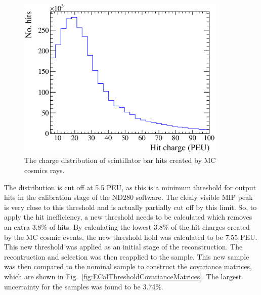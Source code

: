 \begin{figure}
  \centering
  \includegraphics[width=10cm]{images/measurement/systematics/detector/threshold/hit_charge_cosmic_MC_PEU.eps}
  \caption{The charge distribution of scintillator bar hits created by MC cosmics rays.}
  \label{fig:HitChargeCosmicMCPEU}
\end{figure}
The distribution is cut off at 5.5 PEU, as this is a minimum threshold for output hits in the calibration stage of the ND280 software.  The clealy visible MIP peak is very close to this threshold and is actually partially cut off by this limit.  So, to apply the hit inefficiency, a new threshold needs to be calculated which removes an extra 3.8$\%$ of hits.  By calculating the lowest 3.8$\%$ of the hit charges created by the MC cosmic events, the new threshold hold was calculated to be 7.55 PEU.  This new threshold was applied as an initial stage of the reconstruction.  The recontruction and selection was then reapplied to the sample.  This new sample was then compared to the nominal sample to construct the covariance matrices, which are shown in Fig.~\ref{fig:ECalThresholdCovarianceMatrices}.  The largest uncertainty for the samples was found to be 3.74$\%$.
